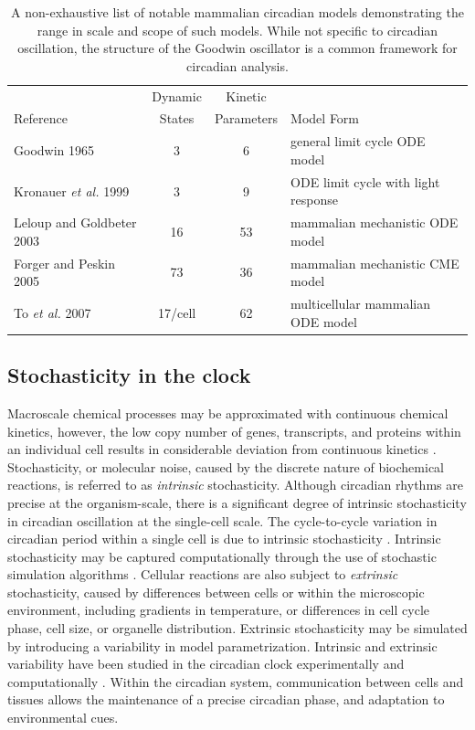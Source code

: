 \begin{table}[t]
    \small
    \caption{A non-exhaustive list of notable mammalian circadian models demonstrating the range in scale and scope of such models. While not specific to circadian oscillation, the structure of the Goodwin oscillator is a common framework for circadian analysis.}
    \begin{tabular}{l c c l} 
         & Dynamic & Kinetic &  \\
         Reference & States & Parameters & Model Form \\
        \hline
        Goodwin 1965 \cite{Goodwin1965} & 3 & 6 & general limit cycle ODE model\\
        Kronauer \textit{et al.} 1999 \cite{Kronauer1999} & 3 & 9 & ODE limit cycle with light response \\
        Leloup and Goldbeter 2003 \cite{Leloup2003a} & 16 & 53 & mammalian mechanistic ODE model\\
        Forger and Peskin 2005 \cite{Forger2005} & 73 & 36 & mammalian mechanistic CME model\\
        To \textit{et al.} 2007 \cite{To2007} & 17/cell & 62 & multicellular mammalian ODE model\\
    \end{tabular} 
\end{table}


\subsection*{Stochasticity in the clock}
Macroscale chemical processes may be approximated with continuous chemical kinetics, however, 
the low copy number of genes, transcripts, and proteins within an individual cell results in considerable
deviation from continuous kinetics \cite{Elowitz2002}.
Stochasticity, or molecular noise, caused by the discrete nature of biochemical 
reactions, is referred to as \textit{intrinsic} stochasticity.
Although circadian rhythms are precise at the organism-scale, there is a significant 
degree of intrinsic stochasticity in circadian oscillation at the single-cell scale.
The cycle-to-cycle variation in circadian period within a single cell is due to intrinsic stochasticity \cite{Herzog2004}.
Intrinsic stochasticity may be captured computationally through the use of stochastic simulation algorithms \cite{Forger2005, Gonze2006}.
Cellular reactions are also subject to \textit{extrinsic} stochasticity, caused by differences
between cells or within the microscopic environment, including gradients in temperature, 
or differences in cell cycle phase, cell size, or organelle distribution.
Extrinsic stochasticity may be simulated by introducing a variability in model parametrization.
Intrinsic and extrinsic variability have been studied in the circadian clock experimentally 
\cite{Herzog2004, Welsh2004} and computationally \cite{Barkai2000, Forger2005, Gonze2006, Rougemont2007, Ko2010, Abel2015a, StJohn2015}.
Within the circadian system, communication between cells and tissues allows the maintenance 
of a precise circadian phase, and adaptation to environmental cues.


